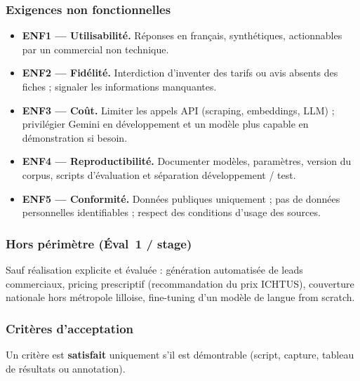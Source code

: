 \subsubsection{Exigences non fonctionnelles}

\begin{itemize}
    \item \textbf{ENF1 --- Utilisabilité.} Réponses en français, synthétiques, actionnables par un
    commercial non technique.
    \item \textbf{ENF2 --- Fidélité.} Interdiction d'inventer des tarifs ou avis absents des fiches ;
    signaler les informations manquantes.
    \item \textbf{ENF3 --- Coût.} Limiter les appels API (scraping, embeddings, LLM) ; privilégier Gemini
    en développement et un modèle plus capable en démonstration si besoin.
    \item \textbf{ENF4 --- Reproductibilité.} Documenter modèles, paramètres, version du corpus, scripts
    d'évaluation et séparation développement / test.
    \item \textbf{ENF5 --- Conformité.} Données publiques uniquement ; pas de données personnelles
    identifiables ; respect des conditions d'usage des sources.
\end{itemize}

\subsubsection{Hors périmètre (Éval~1 / stage)}

Sauf réalisation explicite et évaluée : génération automatisée de leads commerciaux, pricing
prescriptif (recommandation du prix ICHTUS), couverture nationale hors métropole lilloise, fine-tuning
d'un modèle de langue from scratch.

\subsubsection{Critères d'acceptation}

Un critère est \textbf{satisfait} uniquement s'il est démontrable (script, capture, tableau de résultats
ou annotation).

